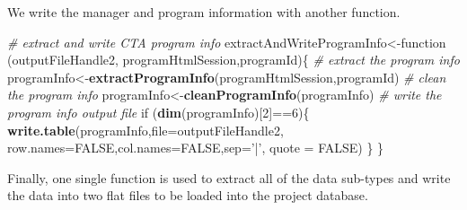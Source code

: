 \documentclass[]{article}
\newenvironment{Shaded}{\begin{snugshade}}{\end{snugshade}}
\newcommand{\KeywordTok}[1]{\textcolor[rgb]{0.13,0.29,0.53}{\textbf{{#1}}}}
\newcommand{\DataTypeTok}[1]{\textcolor[rgb]{0.13,0.29,0.53}{{#1}}}
\newcommand{\DecValTok}[1]{\textcolor[rgb]{0.00,0.00,0.81}{{#1}}}
\newcommand{\StringTok}[1]{\textcolor[rgb]{0.31,0.60,0.02}{{#1}}}
\newcommand{\CommentTok}[1]{\textcolor[rgb]{0.56,0.35,0.01}{\textit{{#1}}}}
\newcommand{\OtherTok}[1]{\textcolor[rgb]{0.56,0.35,0.01}{{#1}}}
\newcommand{\NormalTok}[1]{{#1}}
\begin{document}
We write the manager and program information with another function.

\begin{Shaded}
\begin{Highlighting}[]
\CommentTok{# extract and write CTA program info}
\NormalTok{extractAndWriteProgramInfo<-function (outputFileHandle2,}
  \NormalTok{programHtmlSession,programId)\{}
  \CommentTok{# extract the program info}
  \NormalTok{programInfo<-}\KeywordTok{extractProgramInfo}\NormalTok{(programHtmlSession,programId)}
  \CommentTok{# clean the program info}
  \NormalTok{programInfo<-}\KeywordTok{cleanProgramInfo}\NormalTok{(programInfo)}
  \CommentTok{# write the program info output file}
  \NormalTok{if (}\KeywordTok{dim}\NormalTok{(programInfo)[}\DecValTok{2}\NormalTok{]==}\DecValTok{6}\NormalTok{)\{}
    \KeywordTok{write.table}\NormalTok{(programInfo,}\DataTypeTok{file=}\NormalTok{outputFileHandle2,}
      \DataTypeTok{row.names=}\OtherTok{FALSE}\NormalTok{,}\DataTypeTok{col.names=}\OtherTok{FALSE}\NormalTok{,}\DataTypeTok{sep=}\StringTok{'|'}\NormalTok{,}
      \DataTypeTok{quote =} \OtherTok{FALSE}\NormalTok{)}
  \NormalTok{\}}
\NormalTok{\}}
\end{Highlighting}
\end{Shaded}

Finally, one single function is used to extract all of the data
sub-types and write the data into two flat files to be loaded into the
project database.
\end{document}
